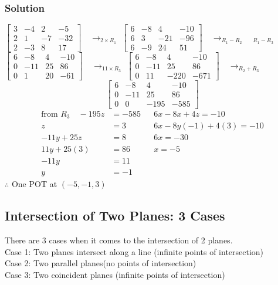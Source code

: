 \documentclass{article}
\begin{document}
\subsubsection*{Solution}
$ \left[\begin{array}{lll|l}
3 & -4 & 2 & -5\\
2 & 1 & -7 & -32\\
2 & -3 & 8 & 17
\end{array}\right] \quad \rightarrow_{2 \times R_1}$
$ \left[\begin{array}{lll|l}
6 & -8 & 4 & -10\\
6 & 3 & -21 & -96\\
6 & -9 & 24 & 51
\end{array}\right] \quad \rightarrow_{R_1-R_2 } \quad _{R_1-R_3}$
$ \left[\begin{array}{lll|l}
6 & -8 & 4 & -10\\
0 & -11 & 25 & 86\\
0 & 1 & 20 & -61
\end{array}\right] \quad \rightarrow_{11 \times R_3}$
$ \left[\begin{array}{lll|l}
6 & -8 & 4 & -10\\
0 & -11 & 25 & 86\\
0 & 11 & -220 & -671
\end{array}\right] \quad \rightarrow_{R_2+R_3}$
$$\left[\begin{array}{lll|l}
6 & -8 & 4 & -10\\
0 & -11 & 25 & 86\\
0 & 0 & -195 & -585
\end{array}\right] $$
\begin{align*}
    \text{from } R_3 \quad -195z&=-585 &&6x-8x+4z=-10\\
    z&=3 && 6x-8y(-1)+4(3)=-10\\
    -11y+25z&=8 && 6x=-30\\
    11y+25(3)&=86 && x=-5\\
    -11y&=11 \\
    y&=-1
\end{align*}
$\therefore$ One POT at $(-5,-1,3)$
\subsection{Intersection of Two Planes: 3 Cases}
There are 3 cases when it comes to the intersection of 2 planes. \\
Case 1: Two planes intersect along a line (infinite points of intersection)\\
Case 2: Two parallel planes(no points of intersection)\\
Case 3: Two coincident planes (infinite points of intersection)
\end{document}
